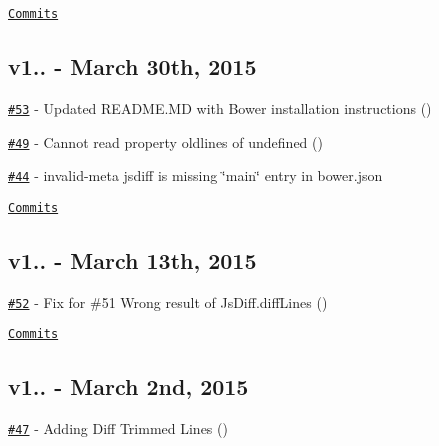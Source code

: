 \href{https://github.com/kpdecker/jsdiff/compare/v1.3.2...v1.4.0}{\tt Commits}

\subsection*{v1.. -\/ March 30th, 2015}


\begin{DoxyItemize}
\item \href{https://github.com/kpdecker/jsdiff/pull/53}{\tt \#53} -\/ Updated R\+E\+A\+D\+M\+E.\+MD with Bower installation instructions (\href{https://api.github.com/users/ofbriggs}{\tt })
\item \href{https://github.com/kpdecker/jsdiff/issues/49}{\tt \#49} -\/ Cannot read property \textquotesingle{}oldlines\textquotesingle{} of undefined (\href{https://api.github.com/users/nwtn}{\tt })
\item \href{https://github.com/kpdecker/jsdiff/issues/44}{\tt \#44} -\/ invalid-\/meta jsdiff is missing \char`\"{}main\char`\"{} entry in bower.\+json
\end{DoxyItemize}

\href{https://github.com/kpdecker/jsdiff/compare/v1.3.1...v1.3.2}{\tt Commits}

\subsection*{v1.. -\/ March 13th, 2015}


\begin{DoxyItemize}
\item \href{https://github.com/kpdecker/jsdiff/pull/52}{\tt \#52} -\/ Fix for \#51 Wrong result of Js\+Diff.\+diff\+Lines (\href{https://api.github.com/users/felicienfrancois}{\tt })
\end{DoxyItemize}

\href{https://github.com/kpdecker/jsdiff/compare/v1.3.0...v1.3.1}{\tt Commits}

\subsection*{v1.. -\/ March 2nd, 2015}


\begin{DoxyItemize}
\item \href{https://github.com/kpdecker/jsdiff/pull/47}{\tt \#47} -\/ Adding Diff Trimmed Lines (\href{https://api.github.com/users/JamesGould123}{\tt })
\end{DoxyItemize}


